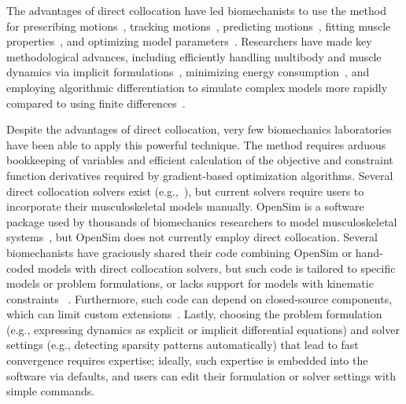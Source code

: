 \documentclass[10pt,letterpaper]{article}
\begin{document}
The advantages of direct collocation have led biomechanists to use the method for prescribing motions~\cite{Groote:2016dq,Ueno:2020}, tracking motions~\cite{Kaplan:2001,Lin:2017jp,Mehrabi:2019,Koelewijn:2016bm,Meyer:2016gl}, predicting motions~\cite{Ackermann:2010dd,Ackermann:2012,Miller:2015fc,Porsa:2015dn,Lee:2016dn,Umberger:2018ec,Bobbert:2016,KMoore:2018ea,Lin:2018ex,Lai:2018,Nguyen:2019,Falisse:2019b,Jansen:2020}, fitting muscle properties~\cite{Falisse:2017}, and optimizing model parameters~\cite{Rohani:2017}. Researchers have made key methodological advances, including efficiently handling multibody and muscle dynamics via implicit formulations~\cite{vandenBogert:2011fv,Groote:2016dq}, minimizing energy consumption~\cite{Koelewijn:2018kw,Koelewijn:2019}, and employing algorithmic differentiation to simulate complex models more rapidly compared to using finite differences~\cite{Falisse:2019a}.

Despite the advantages of direct collocation, very few biomechanics laboratories have been able to apply this powerful technique. The method requires arduous bookkeeping of variables and efficient calculation of the objective and constraint function derivatives required by gradient-based optimization algorithms. Several direct collocation solvers exist (e.g.,~\cite{Becerra:2010,Patterson:2014}), but current solvers require users to incorporate their musculoskeletal models manually. OpenSim is a software package used by thousands of biomechanics researchers to model musculoskeletal systems~\cite{Delp:2007ij,Seth:2018gg,Sherman:2011byc}, but OpenSim does not currently employ direct collocation. Several biomechanists have graciously shared their code combining OpenSim or hand-coded models with direct collocation solvers, but such code is tailored to specific models or problem formulations, or lacks support for models with kinematic constraints ~\cite{Groote:2016dq,Porsa:2015dn,Lee:2016dn,Lin:2018ex}. Furthermore, such code can depend on closed-source components, which can limit custom extensions~\cite{Groote:2016dq}. Lastly, choosing the problem formulation (e.g., expressing dynamics as explicit or implicit differential equations) and solver settings (e.g., detecting sparsity patterns automatically) that lead to fast convergence requires expertise; ideally, such expertise is embedded into the software via defaults, and users can edit their formulation or solver settings with simple commands.
\end{document}
